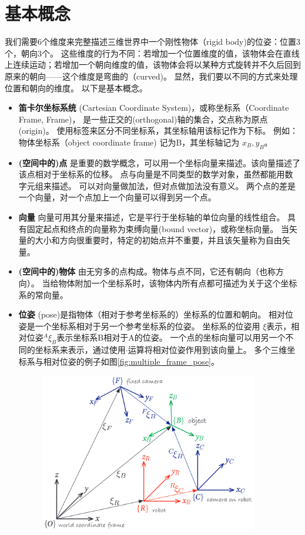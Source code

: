 \documentclass[UTF8,a4paper,10pt]{ctexart}
\begin{document}
\section{基本概念}\label{sec:concepts}
我们需要6个维度来完整描述三维世界中一个刚性物体（rigid body)的位姿：位置3个，朝向3个。
这些维度的行为不同：若增加一个位置维度的值，该物体会在直线上连续运动；若增加一个朝向维度的值，该物体会将以某种方式旋转并不久后回到原来的朝向——这个维度是弯曲的（curved)。
显然，我们要以不同的方式来处理位置和朝向的维度。
以下是基本概念。
\begin{itemize}
\item{\textbf{笛卡尔坐标系统}}
  (Cartesian Coordinate System)，或称坐标系（Coordinate Frame, Frame)，
  是一些正交的(orthogonal)轴的集合，交点称为原点(origin)。
  使用标签来区分不同坐标系，其坐标轴用该标记作为下标。
  例如：物体坐标系（object coordinate frame) 记为{B}，其坐标轴记为 $x_B, y_B$。
\item{\textbf{(空间中的)点}}
  是重要的数学概念，可以用一个坐标向量来描述。该向量描述了该点相对于坐标系的位移。
  点与向量是不同类型的数学对象，虽然都能用数字元组来描述。
  可以对向量做加法，但对点做加法没有意义。
  两个点的差是一个向量，对一个点加上一个向量可以得到另一个点。
\item{\textbf{向量}}
  向量可用其分量来描述，它是平行于坐标轴的单位向量的线性组合。
  具有固定起点和终点的向量称为束缚向量(bound vector)，或称坐标向量。
  当矢量的大小和方向很重要时，特定的初始点并不重要，并且该矢量称为自由矢量。
\item{\textbf{(空间中的)物体}}
  由无穷多的点构成。物体与点不同，它还有朝向（也称方向）。
  当给物体附加一个坐标系时，该物体内所有点都可描述为关于这个坐标系的常向量。
\item{\textbf{位姿}}
  (pose)是指物体（相对于参考坐标系的）坐标系的位置和朝向。
  相对位姿是一个坐标系相对于另一个参考坐标系的位姿。
  坐标系的位姿用 $\xi$表示，相对位姿${}^A\xi_B$表示坐标系{B}相对于{A}的位姿。
  一个点的坐标向量可以用另一个不同的坐标系来表示，通过使用$\cdot$运算将相对位姿作用到该向量上。
  多个三维坐标系与相对位姿的例子如图\eqref{fig:multiple_frame_pose}。
  \begin{figure}[htbp]
    \centerline{\includegraphics[width=0.9\textwidth]{multiple_frame_pose}}

\end{figure}
\end{itemize}
\end{document}

